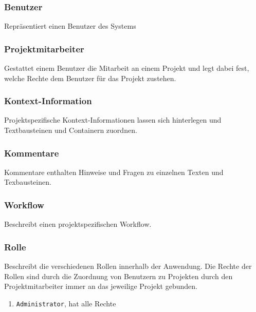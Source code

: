 \subsubsection{Benutzer}\label{model:benutzer}

Repräsentiert einen Benutzer des Systems

\subsubsection{Projektmitarbeiter}\label{model:projektmitarbeiter}

Gestattet einem Benutzer die Mitarbeit an einem Projekt und legt dabei fest, welche Rechte dem Benutzer für das Projekt zustehen.

\subsubsection{Kontext-Information}\label{model:contextinfo}

Projektspezifische Kontext-Informationen lassen sich hinterlegen und Textbausteinen und Containern zuordnen.

\subsubsection{Kommentare}\label{model:notizen}

Kommentare enthalten Hinweise und Fragen zu einzelnen Texten und Texbausteinen.

\subsubsection{Workflow}\label{model:workflow}

Beschreibt einen projektspezifischen Workflow.



\subsubsection{Rolle}\label{model:rolle}

Beschreibt die verschiedenen Rollen innerhalb der Anwendung. Die Rechte der Rollen sind durch die Zuordnung von Benutzern zu Projekten durch den Projektmitarbeiter immer an das jeweilige Projekt gebunden.

\begin{enumerate}\itemsep -5pt
\item \texttt{Administrator}, hat alle Rechte 
\end{enumerate}

